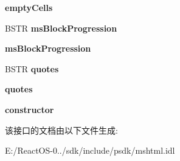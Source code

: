 \begin{DoxyCompactItemize}
\item 
\mbox{\label{interface_m_s_h_t_m_l_1_1_disp_h_t_m_l_style_a84e6e9c8f6e7261deb68e23e33435eec}} 
{\bfseries empty\+Cells}
\item 
\mbox{\label{interface_m_s_h_t_m_l_1_1_disp_h_t_m_l_style_a3e02bbfa08e0ad468cac9edf50e2b16a}} 
B\+S\+TR {\bfseries ms\+Block\+Progression}
\item 
\mbox{\label{interface_m_s_h_t_m_l_1_1_disp_h_t_m_l_style_aff85aeebff23b825eee75935c7ec7334}} 
{\bfseries ms\+Block\+Progression}
\item 
\mbox{\label{interface_m_s_h_t_m_l_1_1_disp_h_t_m_l_style_a6953058014a137bfa37a49e6884cc517}} 
B\+S\+TR {\bfseries quotes}
\item 
\mbox{\label{interface_m_s_h_t_m_l_1_1_disp_h_t_m_l_style_ab42e11ef7b737033ac9a966cb92efacc}} 
{\bfseries quotes}
\item 
\mbox{\label{interface_m_s_h_t_m_l_1_1_disp_h_t_m_l_style_a72ed6a6c97ee594949290b11727281c4}} 
{\bfseries constructor}
\end{DoxyCompactItemize}


该接口的文档由以下文件生成\+:\begin{DoxyCompactItemize}
\item 
E\+:/\+React\+O\+S-\/0../sdk/include/psdk/mshtml.\+idl\end{DoxyCompactItemize}
